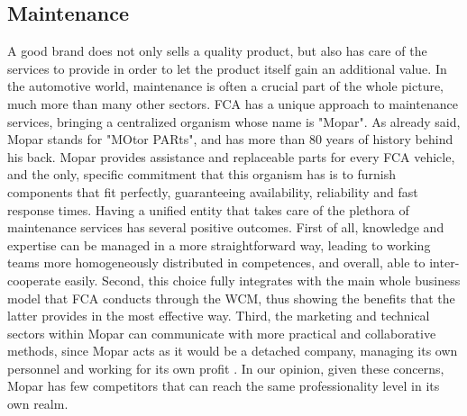 \subsection{Maintenance}

A good brand does not only sells a quality product, but also has care of the services to provide in order to let the product itself gain an additional value.
In the automotive world, maintenance is often a crucial part of the whole picture, much more than many other sectors. FCA has a unique approach to maintenance services, bringing a centralized organism whose name is "Mopar". As already said, Mopar stands for "MOtor PARts", and has more than 80 years of history behind his back. Mopar provides assistance and replaceable parts for every FCA vehicle, and the only, specific commitment that this organism has is to furnish components that fit perfectly, guaranteeing availability, reliability and fast response times.
Having a unified entity that takes care of the plethora of maintenance services has several positive outcomes. First of all, knowledge and expertise can be managed in a more straightforward way, leading to working teams more homogeneously distributed in competences, and overall, able to inter-cooperate easily. Second, this choice fully integrates with the main whole business model that FCA conducts through the WCM, thus showing the benefits that the latter provides in the most effective way. Third, the marketing and technical sectors within Mopar can communicate with more practical and collaborative methods, since Mopar acts as it would be a detached company, managing its own personnel and working for its own profit \cite{maintenance_mopar}.
In our opinion, given these concerns, Mopar has few competitors that can reach the same professionality level in its own realm.